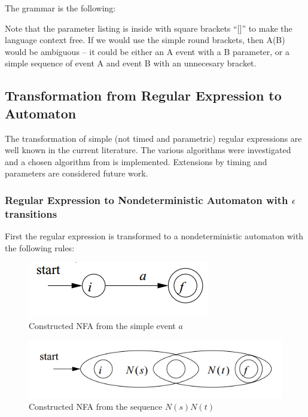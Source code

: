 		The grammar is the following:

		

		Note that the parameter listing is inside with square brackets ``[]'' to make the language context free. If we would use the simple round brackets, then A(B) would be ambiguous -- it could be either an A event with a B parameter, or a simple sequence of event A and event B with an unnecesary bracket.

	\subsection{Transformation from Regular Expression to Automaton}

		The transformation of simple (not timed and parametric) regular expressions are well known in the current literature. The various algorithms were investigated and a chosen algorithm from \citep{lam2006compilers}  is implemented.
		Extensions by timing and parameters are considered future work.

		\subsubsection{Regular Expression to Nondeterministic Automaton with $\epsilon$ transitions}
			First the regular expression is transformed to a nondeterministic automaton with the following rules:

			\begin{figure}[h]
			\centering
			\includegraphics[width=0.3\linewidth]{figures/chapter_4/subexpression_event}
			\caption{Constructed NFA from the simple event $a$ \redraw}
			\label{fig:cep:nfaevent}
			\end{figure}

			\begin{figure}[h]
			\centering
			\includegraphics[width=0.5\linewidth]{figures/chapter_4/subexpression_sequence}
			\caption{Constructed NFA from the sequence $N(s)N(t)$ \redraw}
			\label{fig:cep:nfasequence}
			\end{figure}

